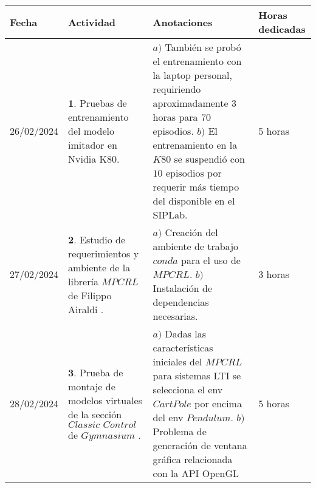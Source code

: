 \documentclass[12pt]{article}
\begin{document}
\begin{minipage}[h]{\textwidth}
	\centering
	\begin{tabularx}{\textwidth}{|p{2cm}|X|X|p{2cm}|} 
		\hline
		\rowcolor{encabezado}
		\textbf{Fecha} & 
		\textbf{Actividad} & 
		\textbf{Anotaciones} & 
		\textbf{Horas dedicadas} \\ \hline
		26/02/2024 & 
		$\mathbf{1}.$ Pruebas de entrenamiento del modelo imitador en Nvidia K80. & 
		$a)$ También se probó el entrenamiento con la laptop personal, requiriendo aproximadamente $3$ horas para $70$ episodios. \newline 
		$b)$ El entrenamiento en la $K80$ se suspendió con $10$ episodios por requerir más tiempo del disponible en el SIPLab. \newline & 
		5 horas \\
	 	27/02/2024 & 
	 	$\mathbf{2}.$ Estudio de requerimientos y ambiente de la librería \href{https://github.com/FilippoAiraldi/mpc-reinforcement-learning/tree/main}{$MPCRL$} de Filippo Airaldi \cite{Airdaldi2023}. &
	 	$a)$ Creación del ambiente de trabajo $conda$ para el uso de $MPCRL$. \newline
	 	$b)$ Instalación de dependencias necesarias. \newline  & 
	 	3 horas \\
	 	28/02/2024 & 
	 	$\mathbf{3}.$ Prueba de montaje de modelos virtuales de la sección $Classic\,\, Control$ de \href{https://gymnasium.farama.org/environments/classic_control/}{$Gymnasium$} \cite{gym}. & 
	 	$a)$ Dadas las características iniciales del $MPCRL$ para sistemas LTI se selecciona el env $Cart Pole$ por encima del env $Pendulum$. \newline 
	 	$b)$ Problema de generación de ventana gráfica relacionada con la API OpenGL \newline & 
	 	5 horas \\
	 	
	 	\hline
	\end{tabularx}
\end{minipage}	 	
	 	
\end{document}
